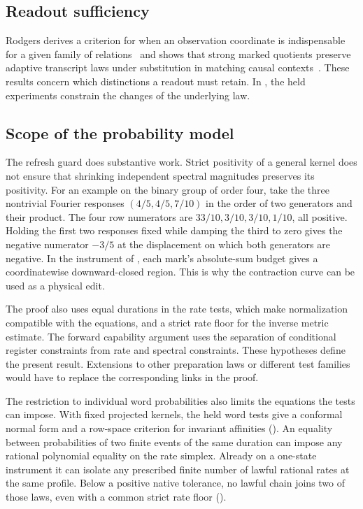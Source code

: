 \subsection{Readout sufficiency}

Rodgers derives a criterion for when an observation coordinate is
indispensable for a given family of
relations~\citep[Theorems 5.1 and 6.2]{rodgerscompletion}
and shows that strong marked quotients preserve adaptive transcript
laws under substitution in matching causal
contexts~\citep[Theorems 6.1--6.2]{rodgersboundaries}. These results
concern which distinctions a readout must retain. In ,
the held experiments constrain the changes of the underlying law.

\subsection{Scope of the probability model}

The refresh guard does substantive work. Strict positivity of a
general kernel does not ensure that shrinking independent spectral
magnitudes preserves its positivity. For an example on the binary
group of order four, take the three nontrivial Fourier responses
\((4/5,4/5,7/10)\) in the order of two generators and their
product. The four row numerators are
\(33/10,3/10,3/10,1/10\), all positive. Holding the first two
responses fixed while damping the third to zero gives the
negative numerator \(-3/5\) at the displacement on which
both generators are negative. In the instrument of ,
each mark's absolute-sum budget gives a coordinatewise
downward-closed region. This is why the contraction curve
can be used as a physical edit.

The proof also uses equal durations in the rate tests, which
make normalization compatible with the equations, and a strict
rate floor for the inverse metric estimate.
The forward capability argument uses the separation of
conditional register constraints from rate and spectral constraints.
These hypotheses define the present result. Extensions to other
preparation laws or different test families would have to replace
the corresponding links in the proof.

The restriction to individual word probabilities also limits the
equations the tests can impose. With fixed projected kernels, the held
word tests give a conformal normal form and a row-space criterion
for invariant affinities ().
An equality between probabilities of two finite events of the same
duration can impose any rational polynomial equality on the rate
simplex. Already on a one-state instrument it can isolate any
prescribed finite number of lawful rational rates at the same profile.
Below a positive native tolerance, no lawful chain joins two of
those laws, even with a common strict rate floor
().
